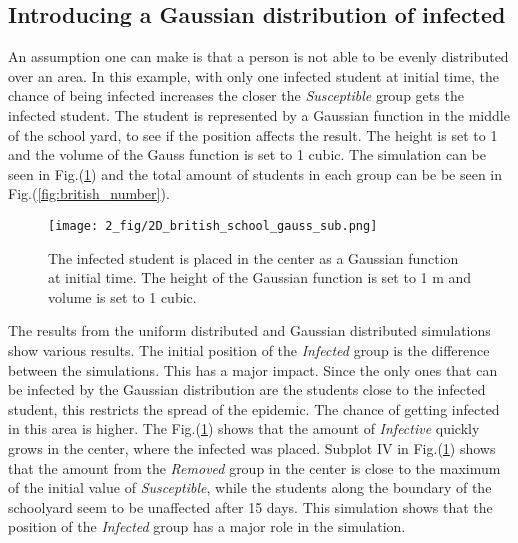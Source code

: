 \documentclass[%
twoside,                 %
final,                   %
chapterprefix=true,      %
open=right               %
10pt]{book}
\begin{document}
\noindent

\subsection{Introducing a Gaussian distribution of infected}
An assumption one can make is that a person is not able to be evenly distributed over an area. In this example, with only one infected student at initial time, the chance of being infected increases the closer the \emph{Susceptible} group gets the infected student. The student is represented by a Gaussian function in the middle of the school yard, to see if the position affects the result. The height is set to 1 and the volume of the Gauss function is set to 1 cubic. The simulation can be seen in Fig.(\ref{fig:gauss_sub}) and the total amount of students in each group can be be seen in Fig.(\ref{fig:british_number}).


\begin{figure}[ht]
  \centerline{\texttt{[image: 2\_fig/2D\_british\_school\_gauss\_sub.png]}}
  \caption{
  \label{fig:gauss_sub} The infected student is placed in the center as a Gaussian function at initial time. The height of the Gaussian function is set to 1 m and volume is set to 1 cubic.
  }
\end{figure}




\vspace{3mm}




\vspace{3mm}


The results from the uniform distributed and Gaussian distributed simulations show various results. The initial position of the \emph{Infected} group is the difference between the simulations. This has a major impact. Since the only ones that can be infected by the Gaussian distribution are the students close to the infected student, this restricts the spread of the epidemic. The chance of getting infected in this area is higher. The Fig.(\ref{fig:gauss_sub}) shows that the amount of \emph{Infective} quickly grows in the center, where the infected was placed. Subplot IV in Fig.(\ref{fig:gauss_sub}) shows that the amount from the \emph{Removed} group in the center is close to the maximum of the initial value of \emph{Susceptible}, while the students along the boundary of the schoolyard seem to be unaffected after 15 days. This simulation shows that the position of the \emph{Infected} group has a major role in the simulation.
\end{document}
